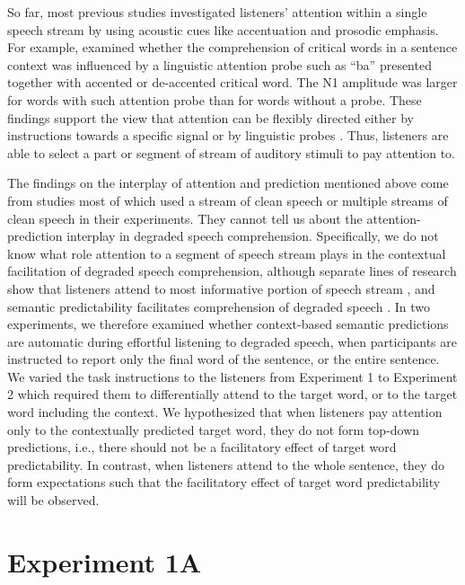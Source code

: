 \documentclass[a4paper, nobind]{templates/ociamthesis}
\begin{document}
So far, most previous studies investigated listeners' attention within a single speech stream by using acoustic cues like accentuation and prosodic emphasis.
For example, \textcite{Li2014} examined whether the comprehension of critical words in a sentence context was influenced by a linguistic attention probe such as ``ba'' presented together with accented or de-accented critical word.
The N1 amplitude was larger for words with such attention probe than for words without a probe.
These findings support the view that attention can be flexibly directed either by instructions towards a specific signal or by linguistic probes \autocite[see also, \textcite{Brunelliere2019}]{Li2017}.
Thus, listeners are able to select a part or segment of stream of auditory stimuli to pay attention to.

The findings on the interplay of attention and prediction mentioned above come from studies most of which used a stream of clean speech or multiple streams of clean speech in their experiments.
They cannot tell us about the attention-prediction interplay in degraded speech comprehension.
Specifically, we do not know what role attention to a segment of speech stream plays in the contextual facilitation of degraded speech comprehension,
although separate lines of research show that listeners attend to most informative portion of speech stream \autocite[e.g.,][]{Astheimer2011}, and semantic predictability facilitates comprehension of degraded speech \autocite[e.g.,][]{Obleser2010}.
In two experiments, we therefore examined whether context-based semantic predictions are automatic during effortful listening to degraded speech, when participants are instructed to report only the final word of the sentence, or the entire sentence.
We varied the task instructions to the listeners from Experiment 1 to Experiment 2 which required them to differentially attend to the target word, or to the target word including the context.
We hypothesized that when listeners pay attention only to the contextually predicted target word, they do not form top-down predictions, i.e., there should not be a facilitatory effect of target word predictability.
In contrast, when listeners attend to the whole sentence, they do form expectations such that the facilitatory effect of target word predictability will be observed.

\hypertarget{experiment-1a}{%
\section{Experiment 1A}\label{experiment-1a}}
\end{document}

